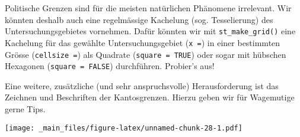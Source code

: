 \documentclass[]{book}
\begin{document}
Politische Grenzen sind für die meisten natürlichen Phänomene irrelevant. Wir könnten deshalb auch eine regelmässige Kachelung (sog. Tesselierung) des Untersuchungsgebietes vornehmen. Dafür könnten wir mit \texttt{st\_make\_grid()} eine Kachelung für das gewählte Untersuchungsgebiet (\texttt{x\ =}) in einer bestimmten Grösse (\texttt{cellsize\ =}) als Quadrate (\texttt{square\ =\ TRUE}) oder sogar mit hübschen Hexagonen (\texttt{square\ =\ FALSE}) durchführen. Probier's aus!

Eine weitere, zusätzliche (und sehr anspruchsvolle) Herausforderung ist das Zeichnen und Beschriften der Kantosgrenzen. Hierzu geben wir für Wagemutige gerne Tips.

\texttt{[image: \_main\_files/figure-latex/unnamed-chunk-28-1.pdf]}
\end{document}
